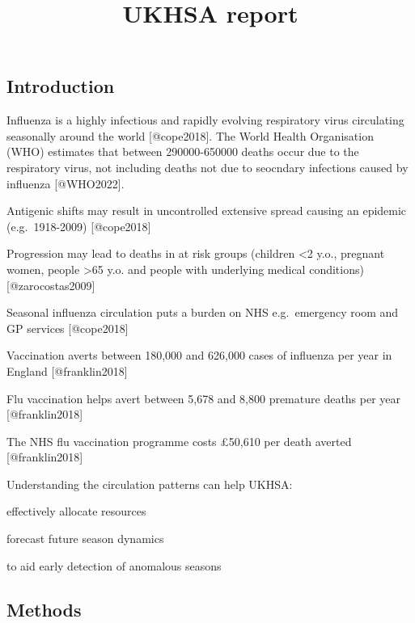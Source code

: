 \documentclass[
  letterpaper,
  DIV=11,
  numbers=noendperiod]{scrartcl}
\title{UKHSA report}
\author{}
\date{}
\begin{document}
\maketitle
\ifdefined\Shaded\renewenvironment{Shaded}{\begin{tcolorbox}[boxrule=0pt, borderline west={3pt}{0pt}{shadecolor}, frame hidden, enhanced, interior hidden, sharp corners, breakable]}{\end{tcolorbox}}\fi

\hypertarget{introduction}{%
\subsection{Introduction}\label{introduction}}

Influenza is a highly infectious and rapidly evolving respiratory virus
circulating seasonally around the world {[}@cope2018{]}. The World
Health Organisation (WHO) estimates that between 290000-650000 deaths
occur due to the respiratory virus, not including deaths not due to
seocndary infections caused by influenza {[}@WHO2022{]}.

\Aizaz Antigenic shifts may result in uncontrolled extensive spread
causing an epidemic (e.g.~1918-2009) {[}@cope2018{]}

\Gabriel Progression may lead to deaths in at risk groups (children
\textless2 y.o., pregnant women, people \textgreater65 y.o. and people
with underlying medical conditions) {[}@zarocostas2009{]}

\Gabriel Seasonal influenza circulation puts a burden on NHS
e.g.~emergency room and GP services {[}@cope2018{]}

\Jack Vaccination averts between 180,000 and 626,000 cases of influenza
per year in England {[}@franklin2018{]}

\Jack Flu vaccination helps avert between 5,678 and 8,800 premature
deaths per year {[}@franklin2018{]}

\Jack The NHS flu vaccination programme costs £50,610 per death averted
{[}@franklin2018{]}

\Szymon Understanding the circulation patterns can help UKHSA:

effectively allocate resources

forecast future season dynamics

to aid early detection of anomalous seasons

\hypertarget{methods}{%
\subsection{Methods}\label{methods}}
\end{document}
